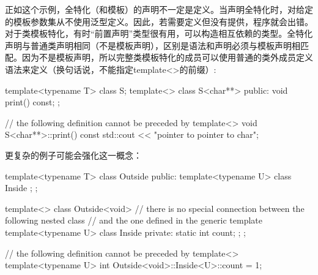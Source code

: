 
正如这个示例，全特化（和模板）的声明不一定是定义。当声明全特化时，对给定的模板参数集从不使用泛型定义。因此，若需要定义但没有提供，程序就会出错。对于类模板特化，有时“前置声明”类型很有用，可以构造相互依赖的类型。全特化声明与普通类声明相同（不是模板声明），区别是语法和声明必须与模板声明相匹配。因为不是模板声明，所以完整类模板特化的成员可以使用普通的类外成员定义语法来定义（换句话说，不能指定template<>的前缀）:

\begin{cpp}
template<typename T>
class S;
template<> class S<char**> {
	public:
	void print() const;
};

// the following definition cannot be preceded by template<>
void S<char**>::print() const {
	std::cout << "pointer to pointer to char\n";
}
\end{cpp}

更复杂的例子可能会强化这一概念：

\begin{cpp}
template<typename T>
class Outside {
	public:
	template<typename U>
	class Inside {
	};
};

template<>
class Outside<void> {
	// there is no special connection between the following nested class
	// and the one defined in the generic template
	template<typename U>
	class Inside {
		private:
		static int count;
	};
};

// the following definition cannot be preceded by template<>
template<typename U>
int Outside<void>::Inside<U>::count = 1;
\end{cpp}

